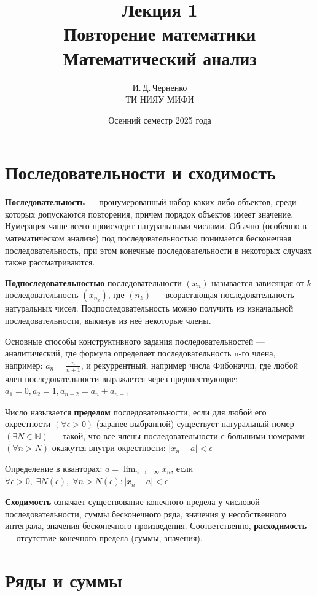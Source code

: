 \documentclass[a4paper,14pt,fleqn]{article}
\title{Лекция 1\\Повторение математики\\Математический анализ}
\author{И.\,Д.\,Черненко\\ТИ НИЯУ МИФИ}
\date{Осенний семестр 2025 года}
\begin{document}
\maketitle

\section{Последовательности и сходимость}

\textbf{Последовательность} --- пронумерованный набор каких-либо объектов, среди которых допускаются
повторения, причем порядок объектов имеет значение. Нумерация чаще всего происходит
натуральными числами. Обычно (особенно в математическом анализе) под последовательностью
понимается бесконечная последовательность, при этом конечные последовательности в некоторых
случаях также рассматриваются.

\textbf{Подпоследовательностью} последовательности $(x_n)$  называется зависящая от $k$ последовательность $(x_{n_k})$, где $(n_k)$ — возрастающая последовательность натуральных чисел. Подпоследовательность можно получить из изначальной последовательности, выкинув из неё некоторые члены.

Основные способы конструктивного задания последовательностей — аналитический, где формула определяет последовательность n-го члена, например: $a_n=\frac{n}{n+1}$, и рекуррентный, например числа Фибоначчи, где любой член последовательности выражается через предшествующие: $a_1=0, a_2=1, a_{n+2}=a_n+a_{n+1}$

Число  называется \textbf{пределом} последовательности, если для любой его окрестности $(\forall\epsilon > 0)$ (заранее выбранной) существует натуральный номер $(\exists N \in \mathbb{N})$ — такой, что все члены последовательности с большими номерами $(\forall n > N)$ окажутся внутри окрестности: $|x_n-a|<\epsilon$

Определение в кванторах: $a=\lim_{n\to+\infty}x_n$, если $\forall\epsilon>0,\;\exists N(\epsilon),\;\forall n>N(\epsilon):|x_n-a|<\epsilon$

\textbf{Сходимость} означает существование конечного предела у числовой последовательности, суммы бесконечного ряда, значения у несобственного интеграла, значения бесконечного произведения.
Соответственно, \textbf{расходимость} --- отсутствие конечного предела (суммы, значения).

\section{Ряды и суммы}
\end{document}
